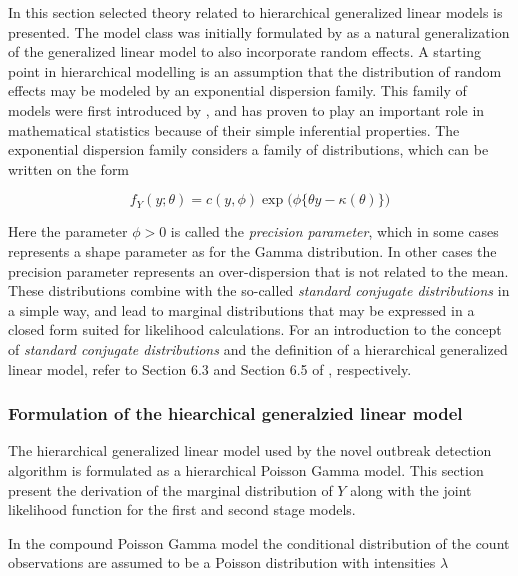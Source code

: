 \documentclass[preprint, 3p,
authoryear]{elsarticle} %
\begin{document}
In this section selected theory related to hierarchical generalized
linear models is presented. The model class was initially formulated by
\citet{Lee_1996} as a natural generalization of the generalized linear
model to also incorporate random effects. A starting point in
hierarchical modelling is an assumption that the distribution of random
effects may be modeled by an exponential dispersion family. This family
of models were first introduced by \citet{Fisher_1922}, and has proven
to play an important role in mathematical statistics because of their
simple inferential properties. The exponential dispersion family
considers a family of distributions, which can be written on the form

\begin{equation}\label{eq:expDispFam}
  f_Y(y;\theta)=c(y,\phi)\exp\big(\phi \{\theta y-\kappa(\theta) \}\big)
\end{equation}

Here the parameter \(\phi>0\) is called the \emph{precision parameter},
which in some cases represents a shape parameter as for the Gamma
distribution. In other cases the precision parameter represents an
over-dispersion that is not related to the mean. These distributions
combine with the so-called \emph{standard conjugate distributions} in a
simple way, and lead to marginal distributions that may be expressed in
a closed form suited for likelihood calculations. For an introduction to
the concept of \emph{standard conjugate distributions} and the
definition of a hierarchical generalized linear model, refer to Section
6.3 and Section 6.5 of \citet{Madsen_2010}, respectively.

\hypertarget{formulation-of-the-hiearchical-generalzied-linear-model}{%
\subsubsection{Formulation of the hiearchical generalzied linear
model}\label{formulation-of-the-hiearchical-generalzied-linear-model}}

The hierarchical generalized linear model used by the novel outbreak
detection algorithm is formulated as a hierarchical Poisson Gamma model.
This section present the derivation of the marginal distribution of
\(Y\) along with the joint likelihood function for the first and second
stage models.

In the compound Poisson Gamma model the conditional distribution of the
count observations are assumed to be a Poisson distribution with
intensities \(\lambda\)
\end{document}
